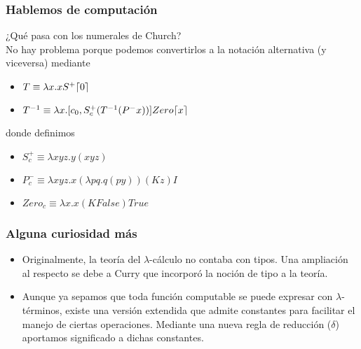 \documentclass[spanish, a4paper, 12pt, final, slideColor, nototal, colorBG, pdf, noaccumulate, darkblue] {beamer}
\DeclarePairedDelimiter{\ceil}{\lceil}{\rceil}
\begin{document}
\begin{frame}
    \frametitle{Hablemos de computación}
    ¿Qué pasa con los numerales de Church?\\
    No hay problema porque podemos convertirlos a la notación alternativa (y viceversa) mediante
    \begin{itemize}
        \item $T \equiv \lambda x.xS^{+}\ceil{0}$
        \item $T^{-1} \equiv \lambda x.[c_0, S^{+}_c (T^{-1}(P^{-}x))]Zero \ceil{x}$
    \end{itemize}
    donde definimos
    \begin{itemize}
        \item $S^{+}_c \equiv \lambda xyz.y(xyz)$
        \item $P^{-}_c \equiv \lambda xyz.x(\lambda pq.q(py))(Kz)I$
        \item $Zero_c \equiv \lambda x.x(K False)True$
    \end{itemize}
\end{frame}
\begin{frame}
    \frametitle{Alguna curiosidad más}
    \begin{itemize}
        \item Originalmente, la teoría del $\lambda$-cálculo no contaba con tipos. Una ampliación al respecto se debe a Curry que incorporó la noción de tipo a la teoría.
        \item Aunque ya sepamos que toda función computable se puede expresar con $\lambda$-términos, existe una versión extendida que admite constantes para facilitar el manejo de ciertas operaciones. Mediante una nueva regla de reducción ($\delta$) aportamos significado a dichas constantes.
    \end{itemize}
\end{frame}
\end{document}
